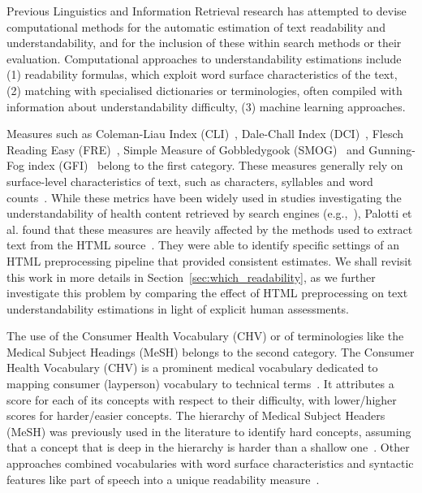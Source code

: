 Previous Linguistics and Information Retrieval research has attempted to devise computational methods for the automatic estimation of text readability and understandability, and for the inclusion of these within search methods or their evaluation. Computational approaches to understandability estimations include (1) readability formulas, which exploit word surface characteristics of the text, (2) matching with specialised dictionaries or terminologies, often compiled with information about understandability difficulty, (3) machine learning approaches.

Measures such as Coleman-Liau Index (CLI)~\cite{cli75}, Dale-Chall Index (DCI)~\cite{dale48}, Flesch Reading Easy (FRE)~\cite{flesch75}, Simple Measure of Gobbledygook (SMOG)~\cite{smog69} and Gunning-Fog index (GFI)~\cite{gunning52} belong to the first category. These measures generally rely on surface-level characteristics of text, such as characters, syllables and word counts~\cite{dubay04}.
While these metrics have been widely used in studies investigating the understandability of health content retrieved by search engines (e.g.,~\cite{becker2004study,graber99readability,fitzsimmons2010readability,wiener2013readability,patel13readability,atcherson14readability,meillier17readability}), Palotti et al. found that these measures are heavily affected by the methods used to extract text from the HTML source~\cite{palotti15}. They were able to identify specific settings of an HTML preprocessing pipeline that provided consistent  estimates. We shall revisit this work in more details in Section~\ref{sec:which_readability}, as we further investigate this problem by comparing the effect of HTML preprocessing on text understandability estimations in light of explicit human assessments. 


The use of the Consumer Health Vocabulary (CHV) or of terminologies like the Medical Subject Headings (MeSH) belongs to the second category. The Consumer Health Vocabulary (CHV) is a prominent medical vocabulary dedicated to mapping consumer (layperson) vocabulary to technical terms~\cite{zeng06}. It attributes a score for each of its concepts with respect to their difficulty, with lower/higher scores for harder/easier concepts.
The hierarchy of Medical Subject Headers (MeSH) was previously used in the literature to identify hard concepts, assuming that a concept that is deep in the hierarchy is harder than a shallow one~\cite{yan11}. Other approaches combined vocabularies with word surface characteristics and syntactic features like part of speech into a unique readability measure~\cite{kim2007beyond}.


